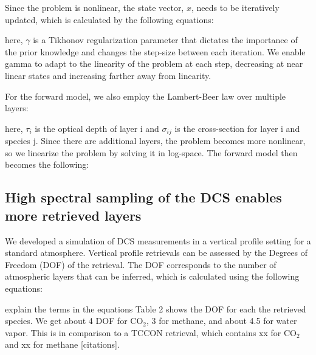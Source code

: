 \documentclass[amt, manuscript]{copernicus}
\begin{document}
Since the problem is nonlinear, the state vector, $x$, needs to be iteratively updated, which is calculated by the following equations:

here, $\gamma$ is a Tikhonov regularization parameter that dictates the importance of the prior knowledge and changes the step-size between each iteration. We enable gamma to adapt to the linearity of the problem at each step, decreasing at near linear states and increasing farther away from linearity.

For the forward model, we also employ the Lambert-Beer law over multiple layers:

here, $\tau_i$ is the optical depth of layer i and  $\sigma_{ij}$ is the cross-section for layer i and species j. Since there are additional layers, the problem becomes more nonlinear, so we linearize the problem by solving it in log-space. The forward model then becomes the following:

\subsection{High spectral sampling of the DCS enables more retrieved layers }
We developed a simulation of DCS measurements in a vertical profile setting for a standard atmosphere. Vertical profile retrievals can be assessed by the Degrees of Freedom (DOF) of the retrieval. The DOF corresponds to the number of atmospheric layers that can be inferred, which is calculated using the following equations:

explain the terms in the equations
Table 2 shows the DOF for each the retrieved species. We get about 4 DOF for CO$_2$, 3 for methane, and about 4.5 for water vapor. This is in comparison to a TCCON retrieval, which contains xx for CO$_2$ and xx for methane [citations]. 
\end{document}
